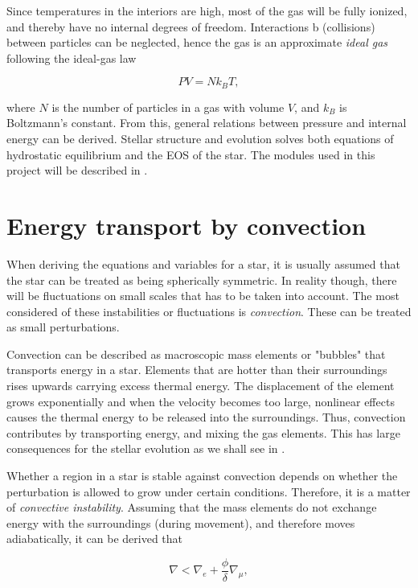Since temperatures in the interiors are high, most of the gas will be fully ionized, and thereby have no internal degrees of freedom. Interactions b (collisions) between particles can be neglected, hence the gas is an approximate \textit{ideal gas} following the ideal-gas law

\begin{equation}
    PV = N k_B T,
\end{equation}

\noindent where $N$ is the number of particles in a gas with volume $V$, and $k_B$ is Boltzmann's constant. From this, general relations between pressure and internal energy can be derived. Stellar structure and evolution solves both equations of hydrostatic equilibrium and the EOS of the star. The modules used in this project will be described in . 


\section{Energy transport by convection}
\label{sec:energybyconvection}
When deriving the equations and variables for a star, it is usually assumed that the star can be treated as being spherically symmetric. In reality though, there will be fluctuations on small scales that has to be taken into account. The most considered of these instabilities or fluctuations is \textit{convection}. These can be treated as small perturbations. 

Convection can be described as macroscopic mass elements or "bubbles" that transports energy in a star. Elements that are hotter than their surroundings rises upwards carrying excess thermal energy. The displacement of the element grows exponentially and when the velocity becomes too large, nonlinear effects causes the thermal energy to be released into the surroundings. Thus, convection contributes by transporting energy, and mixing the gas elements. This has large consequences for the stellar evolution as we shall see in . 

Whether a region in a star is stable against convection depends on whether the perturbation is allowed to grow under certain conditions. Therefore, it is a matter of \textit{convective instability}. Assuming that the mass elements do not exchange energy with the surroundings (during movement), and therefore moves adiabatically, it can be derived that 

\begin{equation}
\label{instability_eq}
    \nabla < \nabla_e + \frac{\phi}{\delta}\nabla_{\mu},
\end{equation}

